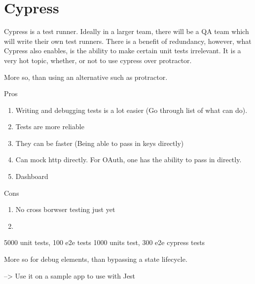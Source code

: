 \maketitle{}
\section{ Cypress }

Cypress is a test runner. Ideally in a larger team, there will be a QA team
which will write their own test runners. There is a benefit of redundancy,
however, what Cypress also enables, is the ability to make certain unit tests
irrelevant. It is a very hot topic, whether, or not to use cypress over
protractor. 

 More so, than using an alternative such as protractor.



Pros
\begin{enumerate}
  \item Writing and debugging tests is a lot easier (Go through list of what
  can do).
  \item Tests are more reliable
  \item They can be faster (Being able to pass in keys directly)
  \item Can mock http directly. For OAuth, one has the ability to pass in
  directly.
  \item Dashboard
\end{enumerate}

Cons
  \begin{enumerate}
    \item No cross borwser testing just yet
    \item
  \end{enumerate}

  5000 unit tests, 100 e2e tests
  1000 units test, 300 e2e cypress tests

  More so for debug elements, than bypassing a state lifecycle.

  --> Use it on a sample app to use with Jest
